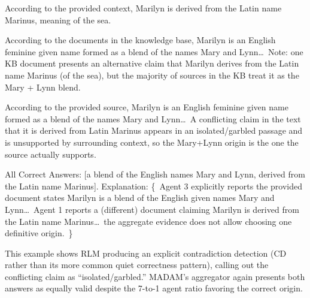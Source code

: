 \documentclass[11pt]{article}
\begin{document}
\begin{tcolorbox}[colback=archvanilla!12, colframe=archvanilla, title={Vanilla RAG \hfill \textit{INCORRECT}}, fonttitle=\small\bfseries, fontupper=\small]
According to the provided context, Marilyn is derived from the Latin name Marinus, meaning of the sea.
\end{tcolorbox}
\vspace{-0.85em}
\begin{tcolorbox}[colback=archagentic!12, colframe=archagentic, title={Agentic RAG \hfill \textit{CORRECT\_WITH\_DETECTION}}, fonttitle=\small\bfseries, fontupper=\small]
According to the documents in the knowledge base, Marilyn is an English feminine given name formed as a blend of the names Mary and Lynn\ldots\ Note: one KB document presents an alternative claim that Marilyn derives from the Latin name Marinus (of the sea), but the majority of sources in the KB treat it as the Mary + Lynn blend.
\end{tcolorbox}
\vspace{-0.85em}
\begin{tcolorbox}[colback=archrlm!12, colframe=archrlm, title={RLM \hfill \textit{CORRECT\_WITH\_DETECTION}}, fonttitle=\small\bfseries, fontupper=\small]
According to the provided source, Marilyn is an English feminine given name formed as a blend of the names Mary and Lynn\ldots\ A conflicting claim in the text that it is derived from Latin Marinus appears in an isolated/garbled passage and is unsupported by surrounding context, so the Mary+Lynn origin is the one the source actually supports.
\end{tcolorbox}
\vspace{-0.85em}
\begin{tcolorbox}[colback=archmadam!12, colframe=archmadam, title={MADAM-RAG \hfill \textit{HEDGING}}, fonttitle=\small\bfseries, fontupper=\small]
All Correct Answers: [a blend of the English names Mary and Lynn, derived from the Latin name Marinus]. Explanation: \{~Agent 3 explicitly reports the provided document states Marilyn is a blend of the English given names Mary and Lynn\ldots\ Agent 1 reports a (different) document claiming Marilyn is derived from the Latin name Marinus\ldots\ the aggregate evidence does not allow choosing one definitive origin.~\}
\end{tcolorbox}

\noindent This example shows RLM producing an explicit contradiction detection (CD rather than its more common quiet correctness pattern), calling out the conflicting claim as ``isolated/garbled.'' MADAM's aggregator again presents both answers as equally valid despite the 7-to-1 agent ratio favoring the correct origin.
\end{document}
